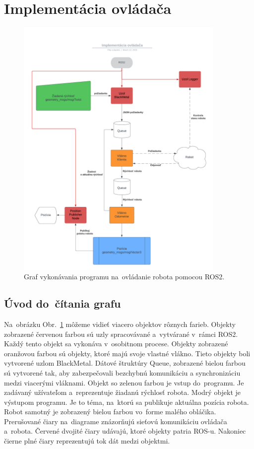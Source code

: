 \section{Implementácia ovládača}
\label{sec:program}

\begin{figure}[!htbp]
	\begin{center}
		\includegraphics[width=0.9\textwidth]{img/BlackMetal_flowchart.png}
	\end{center}
	\caption{Graf vykonávania programu na~ovládanie robota pomocou ROS2.}
	\label{fig:flowchart}
\end{figure}

\subsection{Úvod do~čítania grafu}
\label{sec:citanie_grafu}

Na~obrázku Obr.~\ref{fig:flowchart} môžeme vidieť viacero objektov rôznych farieb. Objekty zobrazené
červenou farbou sú uzly spracovávané a~vytvárané v~rámci ROS2. Každý tento objekt sa vykonáva
v~osobitnom procese. Objekty zobrazené oranžovou farbou sú objekty, ktoré majú svoje
vlastné vlákno.
Tieto objekty boli vytvorené uzlom BlackMetal. Dátové štruktúry Queue, zobrazené bielou farbou
sú vytvorené tak, aby zabezpečovali bezchybnú komunikáciu a synchronizáciu medzi viacerými
vláknami. Objekt so zelenou farbou je vstup do~programu. Je zadávaný užívateľom a~reprezentuje
žiadanú rýchlosť robota. Modrý objekt je výstupom programu. Je to téma, na~ktorú sa publikuje
aktuálna pozícia robota. Robot samotný je zobrazený bielou farbou vo~forme malého obláčika.
Prerušované čiary na~diagrame znázorňujú sieťovú komunikáciu ovládača a~robota. Červené dvojité
čiary udávajú, ktoré objekty patria ROS-u. Nakoniec čierne plné čiary reprezentujú tok dát medzi
objektmi.

